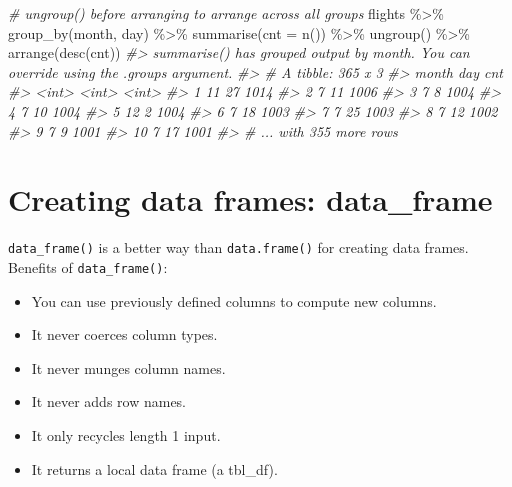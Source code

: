 \documentclass[
]{book}
\newenvironment{Shaded}{\begin{snugshade}}{\end{snugshade}}
\newcommand{\AttributeTok}[1]{\textcolor[rgb]{0.77,0.63,0.00}{#1}}
\newcommand{\CommentTok}[1]{\textcolor[rgb]{0.56,0.35,0.01}{\textit{#1}}}
\newcommand{\FunctionTok}[1]{\textcolor[rgb]{0.00,0.00,0.00}{#1}}
\newcommand{\NormalTok}[1]{#1}
\newcommand{\SpecialCharTok}[1]{\textcolor[rgb]{0.00,0.00,0.00}{#1}}
\providecommand{\tightlist}{%
  \setlength{\itemsep}{0pt}\setlength{\parskip}{0pt}}
\begin{document}
\begin{Shaded}
\begin{Highlighting}[]
\CommentTok{\# ungroup() before arranging to arrange across all groups}
\NormalTok{flights }\SpecialCharTok{\%\textgreater{}\%} \FunctionTok{group\_by}\NormalTok{(month, day) }\SpecialCharTok{\%\textgreater{}\%} \FunctionTok{summarise}\NormalTok{(}\AttributeTok{cnt =} \FunctionTok{n}\NormalTok{()) }\SpecialCharTok{\%\textgreater{}\%} \FunctionTok{ungroup}\NormalTok{() }\SpecialCharTok{\%\textgreater{}\%} \FunctionTok{arrange}\NormalTok{(}\FunctionTok{desc}\NormalTok{(cnt))}
\CommentTok{\#\textgreater{} \textasciigrave{}summarise()\textasciigrave{} has grouped output by \textquotesingle{}month\textquotesingle{}. You can override using the \textasciigrave{}.groups\textasciigrave{} argument.}
\CommentTok{\#\textgreater{} \# A tibble: 365 x 3}
\CommentTok{\#\textgreater{}    month   day   cnt}
\CommentTok{\#\textgreater{}    \textless{}int\textgreater{} \textless{}int\textgreater{} \textless{}int\textgreater{}}
\CommentTok{\#\textgreater{}  1    11    27  1014}
\CommentTok{\#\textgreater{}  2     7    11  1006}
\CommentTok{\#\textgreater{}  3     7     8  1004}
\CommentTok{\#\textgreater{}  4     7    10  1004}
\CommentTok{\#\textgreater{}  5    12     2  1004}
\CommentTok{\#\textgreater{}  6     7    18  1003}
\CommentTok{\#\textgreater{}  7     7    25  1003}
\CommentTok{\#\textgreater{}  8     7    12  1002}
\CommentTok{\#\textgreater{}  9     7     9  1001}
\CommentTok{\#\textgreater{} 10     7    17  1001}
\CommentTok{\#\textgreater{} \# ... with 355 more rows}
\end{Highlighting}
\end{Shaded}

\hypertarget{creating-data-frames-data_frame}{%
\section{Creating data frames: data\_frame}\label{creating-data-frames-data_frame}}

\texttt{data\_frame()} is a better way than \texttt{data.frame()} for creating data frames. Benefits of \texttt{data\_frame()}:

\begin{itemize}
\tightlist
\item
  You can use previously defined columns to compute new columns.
\item
  It never coerces column types.
\item
  It never munges column names.
\item
  It never adds row names.
\item
  It only recycles length 1 input.
\item
  It returns a local data frame (a tbl\_df).
\end{itemize}
\end{document}
